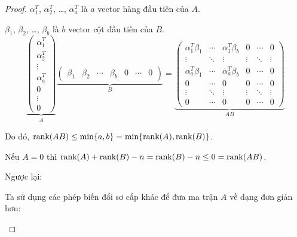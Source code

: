 \documentclass[class=nhvh-linear-algebra,crop=false]{standalone}
\begin{document}
\begin{proof}
    \par $\alpha_{1}^{T}$, $\alpha_{2}^{T}$, \ldots, $\alpha_{a}^{T}$ là $a$ vector hàng đầu tiên của $A$.
    \par $\beta_{1}$, $\beta_{2}$, \ldots, $\beta_{b}$ là $b$ vector cột đầu tiên của $B$.
    \[
        \underbrace{\begin{pmatrix}
                \alpha_{1}^{T} \\
                \alpha_{2}^{T} \\
                \vdots         \\
                \alpha_{a}^{T} \\
                0              \\
                \vdots         \\
                0
            \end{pmatrix}}_{A}
        \underbrace{\begin{pmatrix}
                \beta_{1} & \beta_{2} & \cdots & \beta_{b} & 0 & \cdots & 0
            \end{pmatrix}}_{B}
        =
        \underbrace{\begin{pmatrix}
                \alpha_{1}^{T}\beta_{1} & \cdots & \alpha_{1}^{T}\beta_{b} & 0      & \cdots & 0      \\
                \vdots                  & \ddots & \vdots                  & \vdots & \ddots & \vdots \\
                \alpha_{a}^{T}\beta_{1} & \cdots & \alpha_{a}^{T}\beta_{b} & 0      & \cdots & 0      \\
                0                       & \cdots & 0                       & 0      & \cdots & 0      \\
                \vdots                  & \ddots & \vdots                  & \vdots & \ddots & \vdots \\
                0                       & \cdots & 0                       & 0      & \cdots & 0
            \end{pmatrix}}_{AB}
    \]
    \par Do đó, $\text{rank}(AB)\le \min\{ a, b \} = \min\{ \text{rank}(A), \text{rank}(B) \}$.
    \bigskip
    \par Nếu $A = 0$ thì $\text{rank}(A) + \text{rank}(B) - n = \text{rank}(B) - n\le 0 = \text{rank}(AB)$.
    \par Ngược lại:
    \par Ta sử dụng các phép biến đổi sơ cấp khác để đưa ma trận $A$ về dạng đơn giản hơn:
    \begin{enumerate}[label = (\roman*)]

\end{enumerate}
\end{proof}
\end{document}
